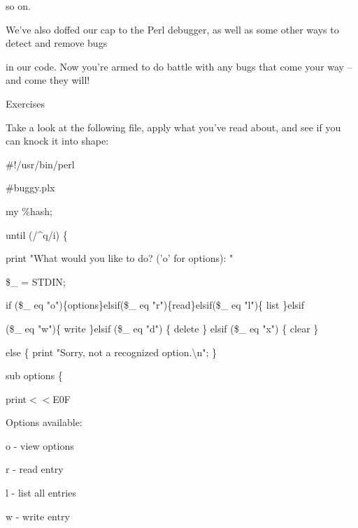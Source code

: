\documentclass[a4paper,11pt]{book}
\begin{document}
\noindent so on.

\noindent 

\noindent We've also doffed our cap to the Perl debugger, as well as some other ways to detect and remove bugs

\noindent in our code. Now you're armed to do battle with any bugs that come your way -- and come they will!

\noindent 

\noindent 

\noindent Exercises

\noindent 

\noindent Take a look at the following file, apply what you've read about, and see if you can knock it into shape:

\noindent 

\noindent 

\noindent \#!/usr/bin/perl

\noindent \#buggy.plx

\noindent 

\noindent my \%hash;

\noindent 

\noindent until (/\^{}q/i) \{

\noindent 

\noindent print "What would you like to do? ('o' for options): "

\noindent \$\_ = STDIN;

\noindent 

\noindent if (\$\_ eq "o")\{options\}elsif(\$\_ eq "r")\{read\}elsif(\$\_ eq "l")\{ list \}elsif

\noindent (\$\_ eq "w")\{ write \}elsif (\$\_ eq "d") \{ delete \} elsif (\$\_ eq "x") \{ clear \}

\noindent else \{ print "Sorry, not a recognized option.\textbackslash n"; \}

\noindent 

\noindent sub options \{

\noindent print$<$$<$E0F

\noindent Options available:

\noindent o - view options

\noindent r - read entry

\noindent l - list all entries

\noindent w - write entry

\noindent 

\noindent 

\noindent 
\end{document}
